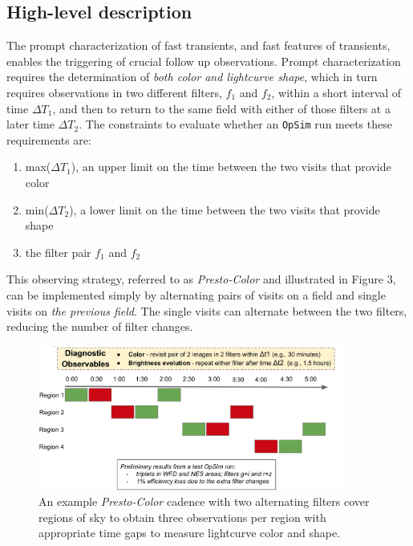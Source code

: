 \documentclass[12pt, letterpaper]{article}
\newcommand{\dtone}{\ensuremath{\Delta T_1}}
\newcommand{\dttwo}{\ensuremath{\Delta T_2}}
\begin{document}
\subsection{High-level description}

The prompt characterization of fast transients, and fast features of transients, enables the triggering of crucial follow up observations. Prompt characterization requires the determination of \emph{both color and lightcurve shape}, which in turn requires observations in two different filters, $f_1$ and $f_2$, within a short interval of time \dtone, and then to return to the same field with either of those filters at a later time \dttwo. The constraints to evaluate whether an {\tt OpSim} run meets these requirements are:
\begin{enumerate}
    \item max(\dtone ), an upper limit on the time between the two visits that provide color
    \item min(\dttwo ), a lower limit on the time between the two visits that provide shape
    \item the filter pair $f_1$ and $f_2$
\end{enumerate}
This observing strategy, referred to as {\em Presto-Color} and illustrated in Figure 3, can be implemented simply by alternating pairs of visits on a field and single visits on \emph{the previous field}. The single visits can alternate between the two filters, reducing the number of filter changes. 

\begin{figure}[!h]
\includegraphics[width=0.9\textwidth]{figures/highLevelCadence.png}
\caption{{\footnotesize An example {\em Presto-Color} cadence with two alternating filters cover regions of sky to obtain three observations per region with appropriate time gaps to measure lightcurve color and shape.}}
\end{figure}
\end{document}
